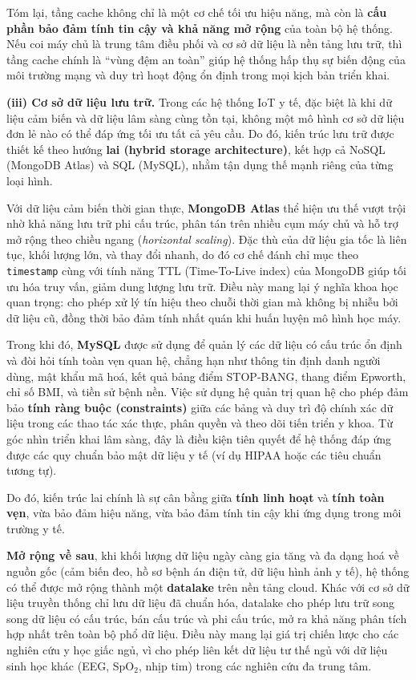 Tóm lại, tầng cache không chỉ là một cơ chế tối ưu hiệu năng, 
mà còn là \textbf{cấu phần bảo đảm tính tin cậy và khả năng mở rộng} của toàn bộ hệ thống. 
Nếu coi máy chủ là trung tâm điều phối và cơ sở dữ liệu là nền tảng lưu trữ, 
thì tầng cache chính là “vùng đệm an toàn” giúp hệ thống hấp thụ sự biến động của môi trường mạng 
và duy trì hoạt động ổn định trong mọi kịch bản triển khai.



\textbf{(iii) Cơ sở dữ liệu lưu trữ.} 
Trong các hệ thống IoT y tế, đặc biệt là khi dữ liệu cảm biến và dữ liệu lâm sàng cùng tồn tại, 
không một mô hình cơ sở dữ liệu đơn lẻ nào có thể đáp ứng tối ưu tất cả yêu cầu. 
Do đó, kiến trúc lưu trữ được thiết kế theo hướng \textbf{lai (hybrid storage architecture)}, 
kết hợp cả NoSQL (MongoDB Atlas) và SQL (MySQL), nhằm tận dụng thế mạnh riêng của từng loại hình. 

Với dữ liệu cảm biến thời gian thực, \textbf{MongoDB Atlas} thể hiện ưu thế vượt trội nhờ khả năng 
lưu trữ phi cấu trúc, phân tán trên nhiều cụm máy chủ và hỗ trợ mở rộng theo chiều ngang 
(\textit{horizontal scaling}). 
Đặc thù của dữ liệu gia tốc là liên tục, khối lượng lớn, và thay đổi nhanh, 
do đó cơ chế đánh chỉ mục theo \texttt{timestamp} cùng với tính năng TTL (Time-To-Live index) 
của MongoDB giúp tối ưu hóa truy vấn, giảm dung lượng lưu trữ.
Điều này mang lại ý nghĩa khoa học quan trọng: cho phép xử lý tín hiệu theo chuỗi thời gian 
mà không bị nhiễu bởi dữ liệu cũ, đồng thời bảo đảm tính nhất quán khi huấn luyện mô hình học máy.

Trong khi đó, \textbf{MySQL} được sử dụng để quản lý các dữ liệu có cấu trúc ổn định và đòi hỏi 
tính toàn vẹn quan hệ, chẳng hạn như thông tin định danh người dùng, mật khẩu mã hoá, 
kết quả bảng điểm STOP-BANG, thang điểm Epworth, chỉ số BMI, và tiền sử bệnh nền. 
Việc sử dụng hệ quản trị quan hệ cho phép đảm bảo \textbf{tính ràng buộc (constraints)} giữa các bảng 
và duy trì độ chính xác dữ liệu trong các thao tác xác thực, phân quyền và theo dõi tiến triển y khoa. 
Từ góc nhìn triển khai lâm sàng, đây là điều kiện tiên quyết để hệ thống đáp ứng được các quy chuẩn 
bảo mật dữ liệu y tế (ví dụ HIPAA hoặc các tiêu chuẩn tương tự).

Do đó, kiến trúc lai chính là sự cân bằng giữa \textbf{tính linh hoạt} và \textbf{tính toàn vẹn}, 
vừa bảo đảm hiệu năng, vừa bảo đảm tính tin cậy khi ứng dụng trong môi trường y tế. 

\textbf{Mở rộng về sau}, khi khối lượng dữ liệu ngày càng gia tăng và đa dạng hoá về nguồn gốc 
(cảm biến đeo, hồ sơ bệnh án điện tử, dữ liệu hình ảnh y tế), hệ thống có thể được mở rộng 
thành một \textbf{datalake} trên nền tảng cloud. 
Khác với cơ sở dữ liệu truyền thống chỉ lưu dữ liệu đã chuẩn hóa, datalake cho phép lưu trữ 
song song dữ liệu có cấu trúc, bán cấu trúc và phi cấu trúc, mở ra khả năng phân tích hợp nhất 
trên toàn bộ phổ dữ liệu. Điều này mang lại giá trị chiến lược cho các nghiên cứu y học giấc ngủ, 
vì cho phép liên kết dữ liệu tư thế ngủ với dữ liệu sinh học khác (EEG, SpO$_2$, nhịp tim) 
trong các nghiên cứu đa trung tâm.

